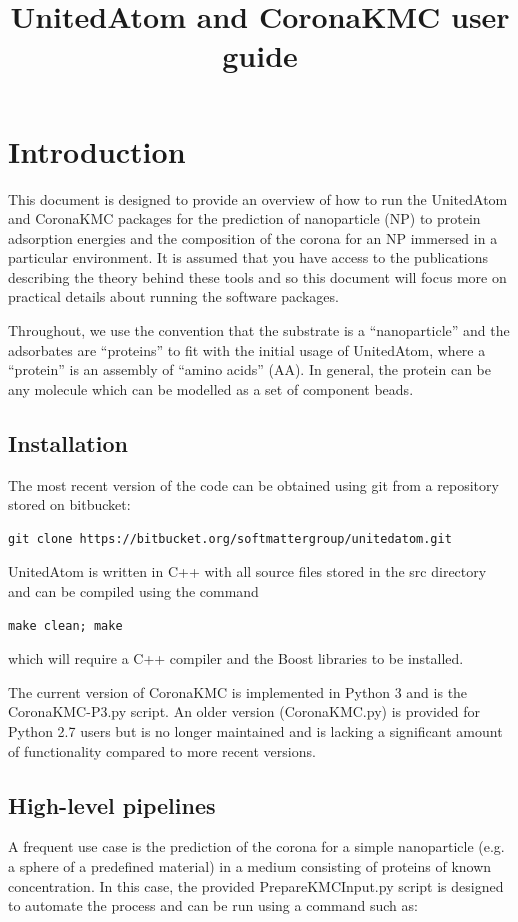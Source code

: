 \documentclass[10pt,a4paper,onecolumn]{report}
\begin{document}
\title{UnitedAtom and CoronaKMC user guide}

\maketitle 

\chapter{Introduction}
This document is designed to provide an overview of how to run the UnitedAtom and CoronaKMC packages for the prediction of nanoparticle (NP) to protein adsorption energies and the composition of the corona for an NP immersed in a particular environment. It is assumed that you have access to the publications describing the theory behind these tools and so this document will focus more on practical details about running the software packages.

Throughout, we use the convention that the substrate is a ``nanoparticle'' and the adsorbates are ``proteins'' to fit with the initial usage of UnitedAtom, where a ``protein'' is an assembly of ``amino acids'' (AA). In general, the protein can be any molecule which can be modelled as a set of component beads.

\section{Installation}
The most recent version of the code can be obtained using git from a repository stored on bitbucket:
\begin{lstlisting}
git clone https://bitbucket.org/softmattergroup/unitedatom.git
\end{lstlisting}

UnitedAtom is written in C++ with all source files stored in the src directory and can be compiled using the command
\begin{lstlisting}
make clean; make
\end{lstlisting}
which will require a C++ compiler and the Boost libraries to be installed.

The current version of CoronaKMC is implemented in Python 3 and is the CoronaKMC-P3.py script. An older version (CoronaKMC.py) is provided for Python 2.7 users but is no longer maintained and is lacking a significant amount of functionality compared to more recent versions. 
 
\section{High-level pipelines}
A frequent use case is the prediction of the corona for a simple nanoparticle (e.g. a sphere of a predefined material) in a medium consisting of proteins of known concentration. In this case, the provided PrepareKMCInput.py script is designed to automate the process and can be run using a command such as:
\end{document}
